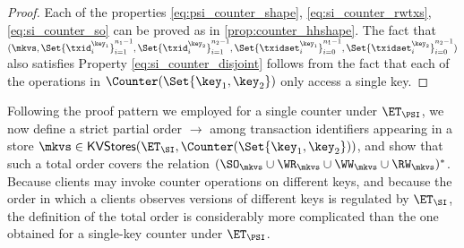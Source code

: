 \begin{proof}
Each of the properties \eqref{eq:psi_counter_shape}, \eqref{eq:si_counter_rwtxs}, \eqref{eq:si_counter_so} 
can be proved as in \cref{prop:counter_hhshape}. The fact that $(\mkvs, \Set{\txid_{i}^{\key_{1}}}_{i=1}^{n_1 - 1}, \Set{\txid^{\key_2}_{i}}_{i=1}^{n_2 - 1}, 
\Set{\txidset_{i}^{\key_1}}_{i=0}^{n_1 - 1}, \Set{\txidset_{i}^{\key_2}}_{i=0}^{n_2-1})$ also satisfies Property \eqref{eq:si_counter_disjoint} 
follows from the fact that each of the operations in $\Counter(\Set{\key_1, \key_2})$ only access a single key. 
\end{proof}

Following the proof pattern we employed for a single counter under $\ET_{\PSI}$, we now 
define a strict partial order $\rightarrow$ among transaction identifiers appearing in a store 
$\mkvs \in \mathsf{KVStores}(\ET_{\SI},  \Counter(\Set{\key_1, \key_2}))$, and show that such a 
total order covers the relation $(\SO_{\mkvs} \cup \WR_{\mkvs} \cup \WW_{\mkvs} \cup \RW_{\mkvs})^{\ast}$. 
Because clients may invoke counter operations on different keys, and because the 
order in which a clients observes versions of different keys is regulated by $\ET_{\SI}$, 
the definition of the total order is considerably more complicated than the one 
obtained for a single-key counter under $\ET_\PSI$.

